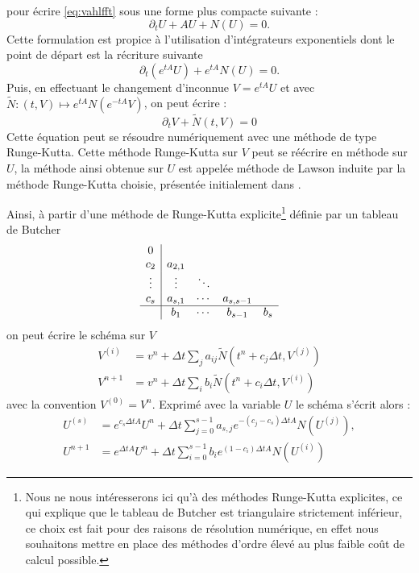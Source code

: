 pour écrire \eqref{eq:vahlfft} sous une forme plus compacte suivante :
$$
  \partial_t U + AU + N(U) = 0. 
$$
Cette formulation est propice à l'utilisation d'intégrateurs exponentiels dont le point de départ est la récriture suivante 
$$
  \partial_t(e^{tA}U) + e^{tA}N(U) = 0. 
$$
Puis, en effectuant le changement d'inconnue $V=e^{tA}U$ et avec $\tilde{N}:(t,V)\mapsto e^{tA}N(e^{-tA}V)$, on peut écrire :
$$
  \partial_t V + \tilde{N}(t,V) = 0
$$
Cette équation peut se résoudre numériquement avec une méthode de type Runge-Kutta. Cette méthode Runge-Kutta sur $V$ peut se réécrire en méthode sur $U$, la méthode ainsi obtenue sur $U$ est appelée méthode de Lawson induite par la méthode Runge-Kutta choisie, présentée initialement dans \cite{Lawson:1967a}.

Ainsi, à partir d'une méthode de Runge-Kutta explicite\footnote{Nous ne nous intéresserons ici qu'à des méthodes Runge-Kutta explicites, ce qui explique que le tableau de Butcher est triangulaire strictement inférieur, ce choix est fait pour des raisons de résolution numérique, en effet nous souhaitons mettre en place des méthodes d'ordre élevé au plus faible coût de calcul possible.} définie par un tableau de Butcher 
$$
  \begin{array}{c|cccc}
    0      &         &        &           & \\
    c_2    & a_{2,1} &        &           & \\
    \vdots & \vdots  & \ddots &           & \\
    c_s    & a_{s,1} & \cdots & a_{s,s-1} & \\
    \hline
           & b_1     & \cdots & b_{s-1}   & b_s
  \end{array}
$$
on peut écrire  le schéma sur $V$ 
$$
  \begin{aligned}
    V^{(i)} &= v^n + \Delta t \sum_j a_{ij} \tilde{N}(t^n+c_j\Delta t , V^{(j)}) \\
    V^{n+1} &= v^n + \Delta t \sum_i b_i \tilde{N}(t^n+c_i\Delta t , V^{(i)})
  \end{aligned}
$$
avec la convention $V^{(0)} = V^n$.  Exprimé avec la variable $U$ le schéma s'écrit alors :
$$
  \begin{aligned}
    U^{(s)} &= e^{c_s \Delta t A}U^n + \Delta t\sum_{j=0}^{s-1} a_{s, j} e^{-(c_j-c_s)\Delta t A} N(U^{(j)}),  \\
    U^{n+1} &= e^{\Delta t A}U^n + \Delta t\sum_{i=0}^{s-1}    b_i e^{(1-c_i)\Delta t A} N(U^{(i)})
  \end{aligned}
$$

